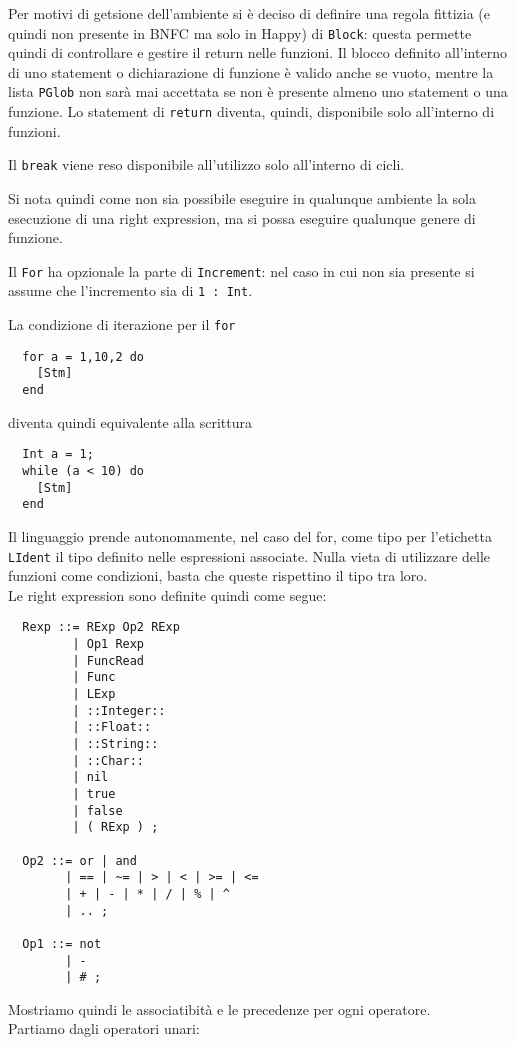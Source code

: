 \documentclass{article}
\begin{document}
Per motivi di getsione dell'ambiente si è deciso di definire una regola fittizia (e quindi non presente in BNFC ma solo
in Happy) di \texttt{Block}: questa permette quindi di controllare e gestire il return nelle funzioni. Il blocco definito
all'interno di uno statement o dichiarazione di funzione è valido anche se vuoto, mentre la lista \texttt{PGlob} non sarà
mai accettata se non è presente almeno uno statement o una funzione. Lo statement di \texttt{return} diventa, quindi, 
disponibile solo all'interno di funzioni.

Il \texttt{break} viene reso disponibile all'utilizzo solo all'interno di cicli.

Si nota quindi come non sia possibile eseguire in qualunque ambiente la sola esecuzione di una right expression, ma si
possa eseguire qualunque genere di funzione.

Il \texttt{For} ha opzionale la parte di \texttt{Increment}: nel caso in cui non sia presente si assume che l'incremento
sia di \texttt{1 : Int}.

La condizione di iterazione per il \texttt{for}
\begin{verbatim}
  for a = 1,10,2 do
    [Stm]
  end
\end{verbatim}
diventa quindi equivalente alla scrittura
\begin{verbatim}
  Int a = 1;  
  while (a < 10) do
    [Stm]
  end
\end{verbatim}

Il linguaggio prende autonomamente, nel caso del for, come tipo per l'etichetta \texttt{LIdent} il tipo definito nelle
espressioni associate. Nulla vieta di utilizzare delle funzioni come condizioni, basta che queste rispettino il tipo
tra loro.
~\\

Le right expression sono definite quindi come segue:
\begin{verbatim}
  Rexp ::= RExp Op2 RExp
         | Op1 Rexp
         | FuncRead
         | Func         
         | LExp
         | ::Integer::
         | ::Float::
         | ::String::
         | ::Char::
         | nil
         | true
         | false
         | ( RExp ) ;
         
  Op2 ::= or | and
        | == | ~= | > | < | >= | <=
        | + | - | * | / | % | ^
        | .. ;
  
  Op1 ::= not
        | -
        | # ; 
\end{verbatim}

Mostriamo quindi le associatibità e le precedenze per ogni operatore.\\
Partiamo dagli operatori unari:
\end{document}
